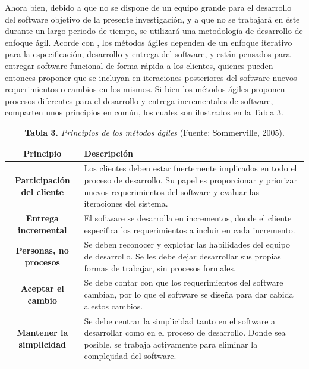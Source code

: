 Ahora bien, debido a que no se dispone de un equipo grande para el desarrollo del software objetivo de la presente investigaci\'{o}n, y a que no se trabajar\'{a} en \'{e}ste durante un largo periodo de tiempo, se utilizar\'{a} una metodolog\'{i}a de desarrollo de enfoque \'{a}gil. Acorde con \cite{Sommerville}, los m\'{e}todos \'{a}giles dependen de un enfoque iterativo para la especificaci\'{o}n, desarrollo y entrega del software, y est\'{a}n pensados para entregar software funcional de forma r\'{a}pida a los clientes, quienes pueden entonces proponer que se incluyan en iteraciones posteriores del software nuevos requerimientos o cambios en los mismos. Si bien los m\'{e}todos \'{a}giles proponen procesos diferentes para el desarrollo y entrega incrementales de software, comparten unos principios en com\'{u}n, los cuales son ilustrados en la Tabla 3.

	\begin{table}[htb]
		\small
		\centering
		\setlength{\extrarowheight}{5pt}
		\begin{tabulary}{15cm}{|c|L|}
			\hline
			\textbf{Principio} & \textbf{Descripci\'{o}n}\\ \hline
			\textbf{Participaci\'{o}n del cliente} & Los clientes deben estar fuertemente implicados en todo el proceso de desarrollo. Su papel es proporcionar y priorizar nuevos requerimientos del software y evaluar las iteraciones del sistema.\\ \hline
			\textbf{Entrega incremental} & El software se desarrolla en incrementos, donde el cliente especifica los requerimientos a incluir en cada incremento.\\ \hline
			\textbf{Personas, no procesos} & Se deben reconocer y explotar las habilidades del equipo de desarrollo. Se les debe dejar desarrollar sus propias formas de trabajar, sin procesos formales.\\ \hline
			\textbf{Aceptar el cambio} & Se debe contar con que los requerimientos del software cambian, por lo que el software se dise\~{n}a para dar cabida a estos cambios.\\ \hline
			\textbf{Mantener la simplicidad} & Se debe centrar la simplicidad tanto en el software a desarrollar como en el proceso de desarrollo. Donde sea posible, se trabaja activamente para eliminar la complejidad del software.\\ \hline
		\end{tabulary}
		\caption{\textbf{Tabla 3.} \textit{Principios de los m\'{e}todos \'{a}giles} (Fuente: Sommerville, 2005).}
	\end{table}

